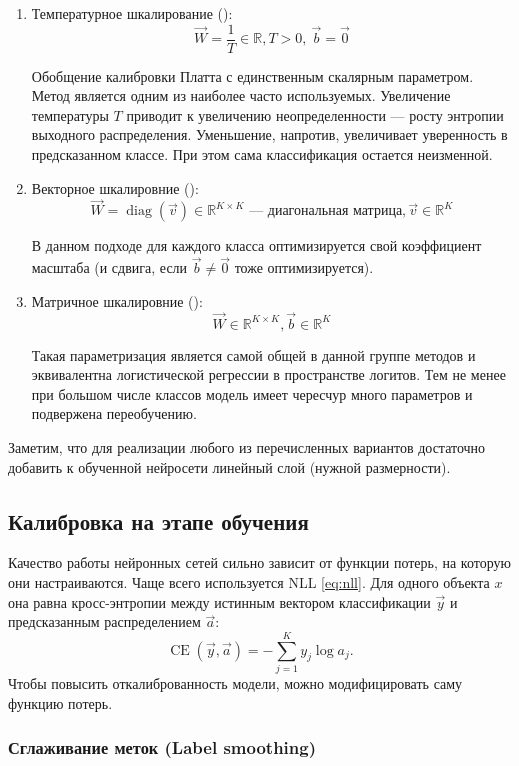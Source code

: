 \documentclass[12pt]{article}
\begin{document}
\begin{enumerate}
    \item Температурное шкалирование ():
    $$\vec{W}=\frac{1}{T}\in\mathbb{R}, T>0, \ \vec{b}=\vec{0}$$
    
    Обобщение калибровки Платта с единственным скалярным параметром. Метод является одним из наиболее часто используемых. Увеличение температуры $T$ приводит к увеличению неопределенности --- росту энтропии выходного распределения. Уменьшение, напротив, увеличивает уверенность в предсказанном классе. При этом сама классификация остается неизменной.

    \item Векторное шкалировние ():
    $$\vec{W}=\operatorname{diag}(\vec{v})\in \mathbb{R}^{K\times K}\text{ --- диагональная матрица}, \vec{v}\in\mathbb{R}^K$$

    В данном подходе для каждого класса оптимизируется свой коэффициент масштаба (и сдвига, если $\vec{b} \neq \vec{0}$ тоже оптимизируется).

    \item Матричное шкалировние ():
    $$\vec{W}\in \mathbb{R}^{K\times K}, \vec{b}\in\mathbb{R}^K$$

    Такая параметризация является самой общей в данной группе методов и эквивалентна логистической регрессии в пространстве логитов. Тем не менее при большом числе классов модель имеет чересчур много параметров и подвержена переобучению.
\end{enumerate}
Заметим, что для реализации любого из перечисленных вариантов достаточно добавить к обученной нейросети линейный слой (нужной размерности).

\subsection{Калибровка на этапе обучения}
Качество работы нейронных сетей сильно зависит от функции потерь, на которую они настраиваются. Чаще всего используется NLL \eqref{eq:nll}. Для одного объекта $x$ она равна кросс-энтропии между истинным вектором классификации $\vec{y}$ и предсказанным распределением $\vec{a}$:
\begin{equation}
    \operatorname{CE}(\vec{y}, \vec{a}) = -\sum_{j=1}^{K} y_j \log{a_j}.
\end{equation}
Чтобы повысить откалиброванность модели, можно модифицировать саму функцию потерь.

\subsubsection{Сглаживание меток (Label smoothing)}
\end{document}
